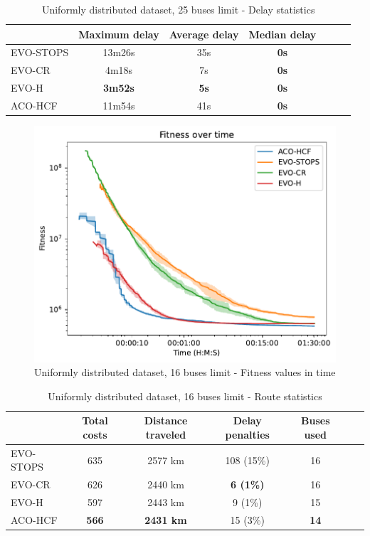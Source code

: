 \begin{table}
    \centering
    \begin{tabular}{lcccccc}
         &  Maximum delay & Average delay & Median delay \\
         \hline
         EVO-STOPS & 13m26s & 35s & \textbf{0s} \\
         EVO-CR & 4m18s & 7s & \textbf{0s} \\
         EVO-H & \textbf{3m52s} & \textbf{5s} & \textbf{0s} \\
         ACO-HCF & 11m54s & 41s & \textbf{0s} \\
    \end{tabular}
    \caption{Uniformly distributed dataset, 25 buses limit - Delay statistics}
    \label{tab:exp_random_25_delay_stats}
\end{table}

\clearpage

\begin{figure}
    \centering
    \includegraphics[width=1\linewidth]
    {img/exp_random_16b_100_time.pdf}
    \caption{Uniformly distributed dataset, 16 buses limit - Fitness values in time}
    \label{fig:exp_random_16}
\end{figure}

\begin{table}
    \centering
    \begin{tabular}{lcccccc}
         & Total costs & Distance traveled & Delay penalties & Buses used \\
         \hline
         EVO-STOPS & 635 & 2577 km & 108 (15\%) & 16 \\
         EVO-CR & 626 & 2440 km & \textbf{6 (1\%)} & 16 \\
         EVO-H & 597 & 2443 km & 9 (1\%) & 15 \\
         ACO-HCF & \textbf{566} & \textbf{2431 km} & 15 (3\%) & \textbf{14} \\
    \end{tabular}
    \caption{Uniformly distributed dataset, 16 buses limit - Route statistics}
    \label{tab:exp_random_16_route_stats}
\end{table}

